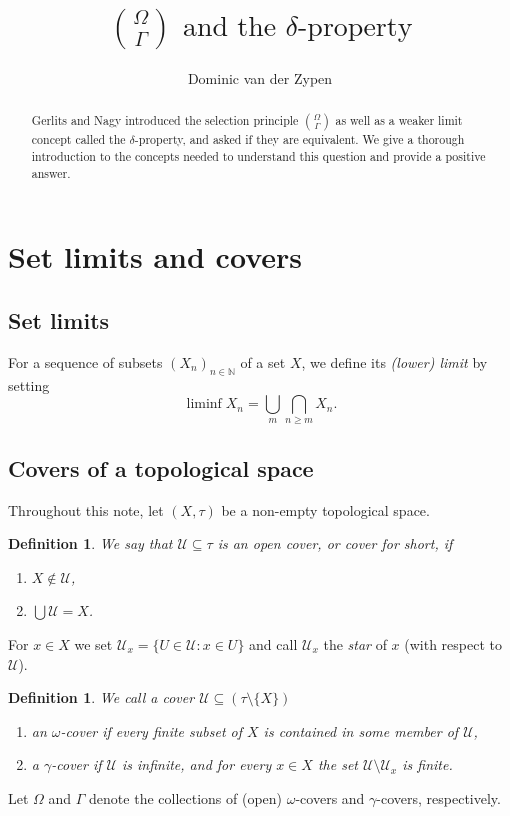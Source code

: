 \documentclass[12pt]{amsart}
\newtheorem{definition}[lemma]{\bf Definition}
\gdef\cal{\mathcal}
\begin{document}
\title{${\Omega \choose \Gamma}\text{ and the }\delta\text{-property}$}
\author{Dominic van der Zypen}
\address{Federal Office of Borders and Customs Security,
Taubenstrasse 16, CH-3003 Bern, Switzerland}

\begin{abstract}
Gerlits and Nagy \cite{gamma} introduced 
the selection principle ${\Omega\choose \Gamma}$ as well
as a weaker limit concept called the $\delta$-property, and asked
if they are equivalent. We give a thorough introduction
to the concepts needed to understand this question and provide
a positive answer.
\end{abstract}

\maketitle
\section{Set limits and covers}
\subsection{Set limits} For a sequence of subsets $(X_n)_{n\in\mathbb{N}}$
of a set $X$, we define its {\em (lower) limit} by setting 
$$\liminf X_n = \bigcup_m\bigcap_{n\geq m}X_n.$$

\subsection{Covers of a topological space}
Throughout this note, let $(X,\tau)$ be a non-empty topological space.
\begin{definition} \label{covdef}
 We say that ${\cal U} \subseteq \tau$ is an {\em open cover}, or
  {\em cover} for short, if \begin{enumerate}
    \item $X\notin {\cal U}$,
    \item $\bigcup {\cal U} = X$.
  \end{enumerate}
\end{definition}
For $x\in X$ we set ${\cal U}_x = \{U \in {\cal U}:
x\in U\}$ and call ${\cal U}_x$ the
{\em star} of $x$ (with respect to ${\cal U}$).
\begin{definition}
	We call a cover ${\cal U}\subseteq (\tau\setminus\{X\})$
\begin{enumerate}
  \item an $\omega$-cover if every finite subset of $X$ is contained
    in some member of ${\cal U}$,
  \item a $\gamma$-cover if ${\cal U}$ is infinite, and
    for every $x\in X$ the set ${\cal U}
    \setminus {\cal U}_x$ is finite.
\end{enumerate}
\end{definition}
Let $\Omega$ and $\Gamma$ denote the collections
of (open) $\omega$-covers and $\gamma$-covers, respectively. 
\end{document}
